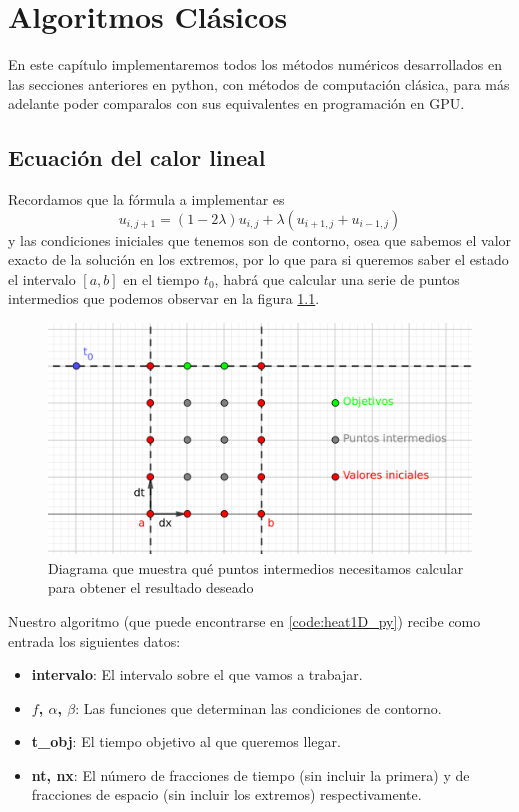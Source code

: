\chapter{Algoritmos Clásicos}\label{cap:alg_clas}
\begin{resumen}
	En este capítulo implementaremos todos los métodos numéricos desarrollados en las secciones anteriores en python, con métodos de computación clásica, para más adelante poder comparalos con sus equivalentes en programación en \ac{GPU}.
\end{resumen}

\section{Ecuación del calor lineal}
Recordamos que la fórmula a implementar es 
\begin{equation}
	u_{i,j+1}=(1-2\lambda)u_{i,j} + \lambda(u_{i+1,j}+u_{i-1,j})
\end{equation}
y las condiciones iniciales que tenemos son de contorno, osea que sabemos el valor exacto de la solución en los extremos, por lo que para si queremos saber el estado el intervalo $[a,b]$ en el tiempo $t_0$, habrá que calcular una serie de puntos intermedios que podemos observar en la figura \ref{fig:1dheatpoints}.

\begin{figure}
	\includegraphics[width=\linewidth]{Imagenes/Bitmap/1dheatpoints.png}
	\caption[Puntos ecuación del calor lineal]{Diagrama que muestra qué puntos intermedios necesitamos calcular para obtener el resultado deseado}
	\label{fig:1dheatpoints}
\end{figure}

Nuestro algoritmo (que puede encontrarse en \ref{code:heat1D_py}) recibe como entrada los siguientes datos:
\begin{itemize}[label=$\bullet$]
	\item \textbf{intervalo}: El intervalo sobre el que vamos a trabajar.
	\item \textbf{$f$, $\alpha$, $\beta$}: Las funciones que determinan las condiciones de contorno.
	\item \textbf{t\_obj}: El tiempo objetivo al que queremos llegar.
	\item \textbf{nt, nx}: El número de fracciones de tiempo (sin incluir la primera) y de fracciones de espacio (sin incluir los extremos) respectivamente.
\end{itemize}

